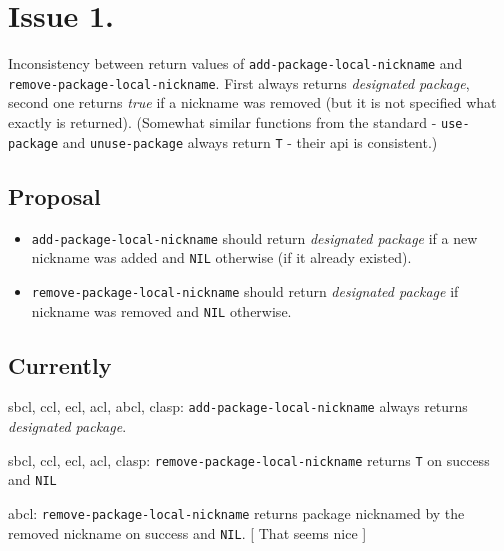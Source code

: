 \documentclass[11pt]{article}
\author{Grolter Bell}
\date{\today}
\title{}
\begin{document}
\section{Issue 1.}
\label{sec:org243633d}
Inconsistency between return values of \texttt{add-package-local-nickname} and
\texttt{remove-package-local-nickname}. First always returns \emph{designated package},
second one returns \emph{true} if a nickname was removed (but it is not specified
what exactly is returned). (Somewhat similar functions from the standard -
\texttt{use-package} and \texttt{unuse-package} always return \texttt{T} - their api is
consistent.)
\subsection{Proposal}
\label{sec:org23ed298}
\begin{itemize}
\item \texttt{add-package-local-nickname} should return \emph{designated package} if a new
nickname was added and \texttt{NIL} otherwise (if it already existed).
\item \texttt{remove-package-local-nickname} should return \emph{designated package} if
nickname was removed and \texttt{NIL} otherwise.
\end{itemize}
\subsection{Currently}
\label{sec:orgb7b19f0}
sbcl, ccl, ecl, acl, abcl, clasp: \texttt{add-package-local-nickname} always returns
\emph{designated package}.

sbcl, ccl, ecl, acl, clasp: \texttt{remove-package-local-nickname} returns \texttt{T} on
success and \texttt{NIL}

abcl: \texttt{remove-package-local-nickname} returns package nicknamed by the
removed nickname on success and \texttt{NIL}.  [ That seems nice ]
\end{document}
